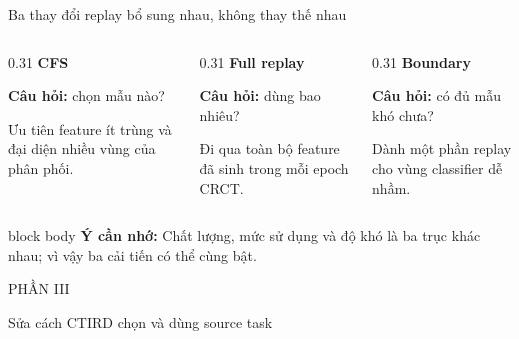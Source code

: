 \documentclass[aspectratio=169,11pt]{beamer}
\newcommand{\remember}[1]{%
  \vfill
  \begin{beamercolorbox}[wd=\textwidth,sep=0.22cm,rounded=true]{block body}
    \textbf{Ý cần nhớ:} #1
  \end{beamercolorbox}
}
\newcommand{\sectionframe}[2]{%
  \begin{frame}[plain]
    \vfill
    {\large\color{HRMBlue}#1}\par\vspace{0.35cm}
    {\Huge\color{HRMDark}#2}\par
    \vfill
  \end{frame}
}
\begin{document}
\begin{frame}{Ba thay đổi replay bổ sung nhau, không thay thế nhau}
  \begin{columns}[T,onlytextwidth]
    \begin{column}{0.31\textwidth}
      {\Large\bfseries CFS}\par\vspace{0.2cm}
      \textbf{Câu hỏi:} chọn mẫu nào?\par\vspace{0.2cm}
      Ưu tiên feature ít trùng và đại diện nhiều vùng của phân phối.
    \end{column}
    \begin{column}{0.31\textwidth}
      {\Large\bfseries Full replay}\par\vspace{0.2cm}
      \textbf{Câu hỏi:} dùng bao nhiêu?\par\vspace{0.2cm}
      Đi qua toàn bộ feature đã sinh trong mỗi epoch CRCT.
    \end{column}
    \begin{column}{0.31\textwidth}
      {\Large\bfseries Boundary}\par\vspace{0.2cm}
      \textbf{Câu hỏi:} có đủ mẫu khó chưa?\par\vspace{0.2cm}
      Dành một phần replay cho vùng classifier dễ nhầm.
    \end{column}
  \end{columns}
  \remember{Chất lượng, mức sử dụng và độ khó là ba trục khác nhau; vì vậy ba cải tiến có thể cùng bật.}
\end{frame}

\sectionframe{PHẦN III}{Sửa cách CTIRD chọn và dùng source task}
\end{document}

